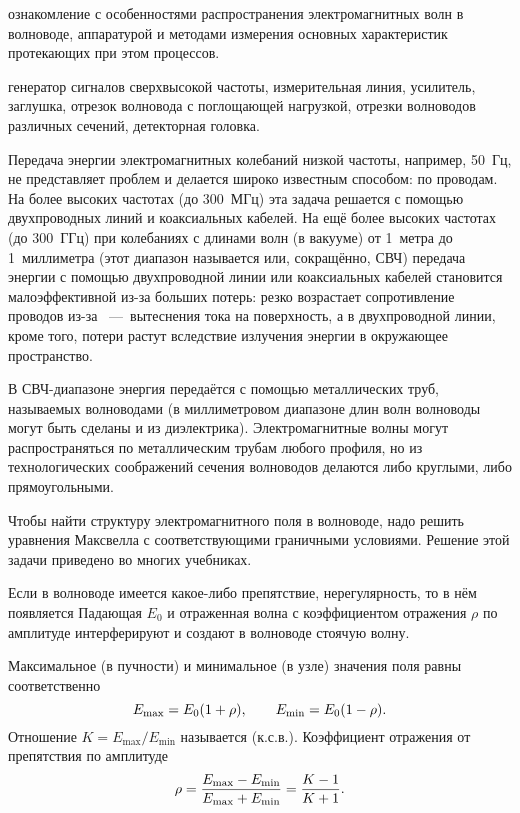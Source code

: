 
\begin{lab:aim} ознакомление с особенностями распространения
    электромагнитных волн в волноводе, аппаратурой и методами измерения основных
    характеристик протекающих при этом процессов. 
\end{lab:aim}

\begin{lab:equipment} генератор сигналов сверхвысокой частоты, измерительная
    линия, усилитель, заглушка, отрезок волновода с поглощающей нагрузкой, отрезки
    волноводов различных сечений, детекторная головка. 
\end{lab:equipment}

Передача энергии электромагнитных колебаний низкой частоты, например, 50~Гц, не
представляет проблем и делается широко известным способом: по проводам. На более
высоких частотах (до 300~МГц) эта задача решается с помощью двухпроводных линий
и коаксиальных кабелей. На ещё более высоких частотах (до 300~ГГц) при
колебаниях с длинами волн (в вакууме) от 1~метра до 1~миллиметра (этот диапазон
называется  или, сокращённо, СВЧ)
передача энергии с помощью двухпроводной линии или коаксиальных кабелей
становится малоэффективной из-за больших потерь: резко возрастает сопротивление
проводов из-за ~---~вытеснения тока на поверхность, а в
двухпроводной линии, кроме того, потери растут вследствие излучения энергии в
окружающее пространство.

В СВЧ-диапазоне энергия передаётся с помощью металлических труб, называемых
волноводами (в миллиметровом диапазоне длин волн волноводы могут быть сделаны и
из диэлектрика). Электромагнитные волны могут распространяться по металлическим
трубам любого профиля, но из технологических соображений сечения волноводов
делаются либо круглыми, либо прямоугольными.

Чтобы найти структуру электромагнитного поля в волноводе, надо решить уравнения
Максвелла с соответствующими граничными условиями. Решение этой задачи приведено
во многих учебниках.

Если в волноводе имеется какое-либо препятствие, нерегулярность, то в нём
появляется  Падающая $E_0$ и отраженная волна с
коэффициентом отражения $\rho$ по амплитуде интерферируют и создают в волноводе
стоячую волну.

Максимальное (в пучности) и минимальное (в узле) значения поля равны
соответственно 
\begin{equation} \eqmark{2.0.5} 
E_{\text{max}}=E_0(1+\rho),
\qquad E_{\text{min}}=E_0(1-\rho). 
\end{equation} 
Отношение
$K=E_{\text{max}}/E_{\text{min}}$ называется  (к.с.в.). Коэффициент отражения от препятствия по амплитуде
\begin{equation} \eqmark{2.0.6}
\rho=\dfrac{E_{\text{max}}-E_{\text{min}}}{E_{\text{max}}+E_{\text{min}}}=\dfrac{K-1}{K+1}. 
\end{equation}

